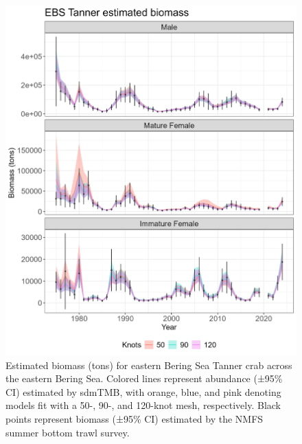 \documentclass[
]{article}
\begin{document}
\begin{figure}

{\centering \includegraphics[width=1\linewidth,height=1\textheight]{../BAIRDI/Figures/TannerEBS.biomass.index} 

}

\caption{Estimated biomass (tons) for eastern Bering Sea Tanner crab across the eastern Bering Sea. Colored lines represent abundance (±95\% CI) estimated by sdmTMB, with orange, blue, and pink denoting models fit with a 50-, 90-, and 120-knot mesh, respectively. Black points represent biomass (±95\% CI) estimated by the NMFS summer bottom trawl survey.}\label{fig:bairdi-bio-index}
\end{figure}
\end{document}
